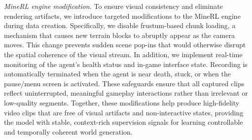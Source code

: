 \documentclass{article}
\begin{document}
\textit{MineRL engine modification.}
To ensure visual consistency and eliminate rendering artifacts, we introduce targeted modifications to the MineRL engine during data creation. Specifically, we disable frustum-based chunk loading, a mechanism that causes new terrain blocks to abruptly appear as the camera moves. This change prevents sudden scene pop-ins that would otherwise disrupt the spatial coherence of the visual stream.
In addition, we implement real-time monitoring of the agent’s health status and in-game interface state. Recording is automatically terminated when the agent is near death, stuck, or when the pause/menu screen is activated. These safeguards ensure that all captured clips reflect uninterrupted, meaningful gameplay interactions rather than irrelevant or low-quality segments.
Together, these modifications help produce high-fidelity video clips that are free of visual artifacts and non-interactive states, providing the model with stable, context-rich supervision signals for learning controllable and temporally coherent world generation.
\end{document}
